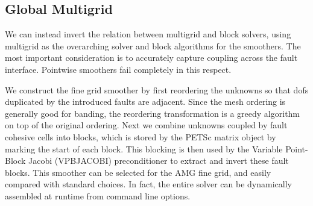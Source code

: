 \documentclass[twoside,leqno,twocolumn]{article}
\begin{document}
\subsection{Global Multigrid}

We can instead invert the relation between multigrid and block solvers, using multigrid as the overarching solver and block algorithms for the smoothers. The most important consideration is to accurately capture coupling across the fault interface. Pointwise smoothers fail completely in this respect.

We construct the fine grid smoother by first reordering the unknowns so that dofs duplicated by the introduced faults are adjacent. Since the mesh ordering is generally good for banding, the reordering transformation is a greedy algorithm on top of the original ordering. Next we combine unknowns coupled by fault cohesive cells into blocks, which is stored by the PETSc matrix object by marking the start of each block. This blocking is then used by the Variable Point-Block Jacobi (VPBJACOBI) preconditioner to extract and invert these fault blocks. This smoother can be selected for the AMG fine grid, and easily compared with standard choices. In fact, the entire solver can be dynamically assembled at runtime from command line options.
\end{document}
